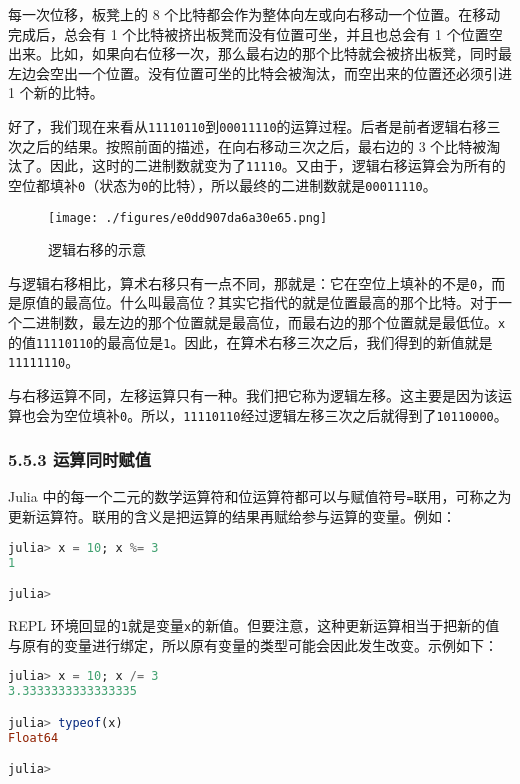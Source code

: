 每一次位移，板凳上的 8 个比特都会作为整体向左或向右移动一个位置。在移动完成后，总会有 1 个比特被挤出板凳而没有位置可坐，并且也总会有 1 个位置空出来。比如，如果向右位移一次，那么最右边的那个比特就会被挤出板凳，同时最左边会空出一个位置。没有位置可坐的比特会被淘汰，而空出来的位置还必须引进 1 个新的比特。

好了，我们现在来看从\verb|11110110|到\verb|00011110|的运算过程。后者是前者逻辑右移三次之后的结果。按照前面的描述，在向右移动三次之后，最右边的 3 个比特被淘汰了。因此，这时的二进制数就变为了\verb|11110|。又由于，逻辑右移运算会为所有的空位都填补\verb|0|（状态为\verb|0|的比特），所以最终的二进制数就是\verb|00011110|。
\begin{figure}[ht]
\centering
\texttt{[image: ./figures/e0dd907da6a30e65.png]}
\caption{逻辑右移的示意} \label{fig_JuC5S5_1}
\end{figure}

与逻辑右移相比，算术右移只有一点不同，那就是：它在空位上填补的不是\verb|0|，而是原值的最高位。什么叫最高位？其实它指代的就是位置最高的那个比特。对于一个二进制数，最左边的那个位置就是最高位，而最右边的那个位置就是最低位。\verb|x|的值\verb|11110110|的最高位是\verb|1|。因此，在算术右移三次之后，我们得到的新值就是\verb|11111110|。

与右移运算不同，左移运算只有一种。我们把它称为逻辑左移。这主要是因为该运算也会为空位填补\verb|0|。所以，\verb|11110110|经过逻辑左移三次之后就得到了\verb|10110000|。

\subsubsection{5.5.3 运算同时赋值}

Julia 中的每一个二元的数学运算符和位运算符都可以与赋值符号\verb|=|联用，可称之为更新运算符。联用的含义是把运算的结果再赋给参与运算的变量。例如：
\begin{lstlisting}[language=julia]
julia> x = 10; x %= 3
1

julia>
\end{lstlisting}

REPL 环境回显的\verb|1|就是变量\verb|x|的新值。但要注意，这种更新运算相当于把新的值与原有的变量进行绑定，所以原有变量的类型可能会因此发生改变。示例如下：
\begin{lstlisting}[language=julia]
julia> x = 10; x /= 3
3.3333333333333335

julia> typeof(x)
Float64

julia> 
\end{lstlisting}

